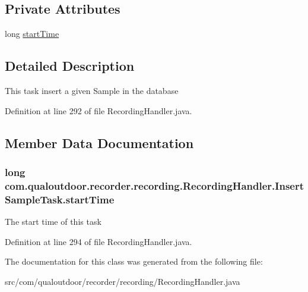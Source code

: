 \subsection*{Private Attributes}
\begin{DoxyCompactItemize}
\item 
long \hyperlink{classcom_1_1qualoutdoor_1_1recorder_1_1recording_1_1RecordingHandler_1_1InsertSampleTask_a1867c57858b668d62ee1e81d38df501b}{start\-Time}
\end{DoxyCompactItemize}


\subsection{Detailed Description}
This task insert a given Sample in the database 

Definition at line 292 of file Recording\-Handler.\-java.



\subsection{Member Data Documentation}
\hypertarget{classcom_1_1qualoutdoor_1_1recorder_1_1recording_1_1RecordingHandler_1_1InsertSampleTask_a1867c57858b668d62ee1e81d38df501b}{
\subsubsection[{start\-Time}]{\setlength{\rightskip}{0pt plus 5cm}long com.\-qualoutdoor.\-recorder.\-recording.\-Recording\-Handler.\-Insert\-Sample\-Task.\-start\-Time\hspace{0.3cm}{\ttfamily [private]}}}\label{classcom_1_1qualoutdoor_1_1recorder_1_1recording_1_1RecordingHandler_1_1InsertSampleTask_a1867c57858b668d62ee1e81d38df501b}
The start time of this task 

Definition at line 294 of file Recording\-Handler.\-java.



The documentation for this class was generated from the following file\-:\begin{DoxyCompactItemize}
\item 
src/com/qualoutdoor/recorder/recording/Recording\-Handler.\-java\end{DoxyCompactItemize}
